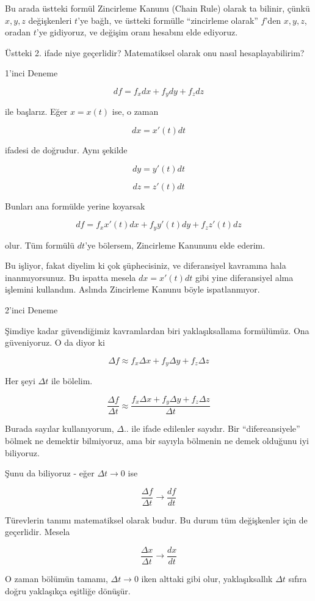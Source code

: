 \documentclass[12pt,fleqn]{article}\usepackage{../../common}
\begin{document}
Bu arada üstteki formül Zincirleme Kanunu (Chain Rule) olarak ta bilinir,
çünkü $x,y,z$ değişkenleri $t$'ye bağlı, ve üstteki formülle ``zincirleme
olarak'' $f$'den $x,y,z$, oradan $t$'ye gidiyoruz, ve değişim oranı
hesabını elde ediyoruz.

Üstteki 2. ifade niye geçerlidir? Matematiksel olarak onu nasıl
hesaplayabilirim? 

1'inci Deneme

$$ df = f_xdx + f_ydy + f_zdz $$

ile başlarız. Eğer $x=x(t)$ ise, o zaman

$$ dx = x'(t)dt $$

ifadesi de doğrudur. Aynı şekilde

$$ dy = y'(t)dt $$

$$ dz = z'(t)dt $$

Bunları ana formülde yerine koyarsak

$$ df = f_xx'(t)dx + f_yy'(t)dy + f_zz'(t)dz $$

olur. Tüm formülü $dt$'ye bölersem, Zincirleme Kanununu elde ederim. 

Bu işliyor, fakat diyelim ki çok şüphecisiniz, ve diferansiyel kavramına
hala inanmıyorsunuz. Bu ispatta mesela $dx = x'(t)dt$ gibi yine
diferansiyel alma işlemini kullandım. Aslında Zincirleme Kanunu böyle
ispatlanmıyor. 

2'inci Deneme

Şimdiye kadar güvendiğimiz kavramlardan biri yaklaşıksallama
formülümüz. Ona güveniyoruz. O da diyor ki 

$$ \Delta f \approx f_x\Delta x + f_y \Delta y + f_z \Delta z $$

Her şeyi $\Delta t$ ile bölelim. 

$$ \frac{\Delta f}{\Delta t} \approx 
\frac{f_x\Delta x + f_y \Delta y + f_z \Delta z }{\Delta t}$$

Burada sayılar kullanıyorum, $\Delta ..$ ile ifade edilenler sayıdır. Bir
``difereansiyele'' bölmek ne demektir bilmiyoruz, ama bir sayıyla bölmenin
ne demek olduğunu iyi biliyoruz. 

Şunu da biliyoruz - eğer $\Delta t \to 0$ ise 

$$ \frac{\Delta f}{\Delta t} \to \frac{df}{dt} $$

Türevlerin tanımı matematiksel olarak budur. Bu durum tüm değişkenler için
de geçerlidir. Mesela

$$ \frac{\Delta x}{\Delta t} \to \frac{dx}{dt} $$

O zaman bölümün tamamı, $\Delta t \to 0$ iken alttaki gibi olur,
yaklaşıksallık $\Delta t$ sıfıra doğru yaklaşıkça eşitliğe dönüşür.
\end{document}
